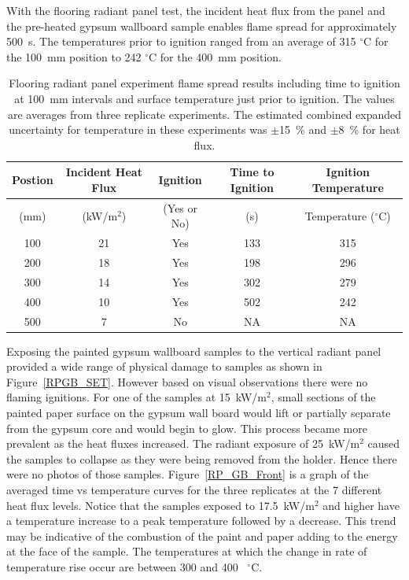 \documentclass[twoside]{uocthesis}
\begin{document}
 With the flooring radiant panel test, the incident heat flux from the panel and the pre-heated gypsum wallboard sample enables flame spread for approximately 500~s.  The temperatures prior to ignition ranged from an average of 315 $^{\circ}$C for the 100~mm position to 242 $^{\circ}$C for the 400~mm position.      
 
      
\begin{table}
	\centering
	\small
	\begin{tabular}{|c|c|c|c|c|}
		\hline Postion & Incident Heat Flux & Ignition & Time to Ignition & Ignition Temperature \\
		\hline (mm) & (kW/m$^2$) & (Yes or No) & (s)  & Temperature ($^{\circ}$C)   \\ \hline
		\hline 100 	& 21	& Yes 	& 133	& 315 	 \\
		\hline 200	& 18 	& Yes 	& 198 	& 296 	 \\
		\hline 300	& 14	& Yes 	& 302 	& 279 	 \\
		\hline 400	& 10	& Yes 	& 502 	& 242 	 \\
		\hline 500	&  7	& No 	& NA 	& NA   	 \\
		\hline
	\end{tabular}
	\caption[Flooring radiant panel experiment flame spread results]{Flooring radiant panel experiment flame spread results including time to ignition at 100~mm intervals and surface temperature just prior to ignition.  The values are averages from three replicate experiments.  The estimated combined expanded uncertainty for temperature in these experiments was $\pm$15~\% and $\pm$8~\% for heat flux.}
	\label{tab:FRP_timetemp}
\end{table}


Exposing the painted gypsum wallboard samples to the vertical radiant panel provided a wide range of physical damage to samples as shown in Figure~\ref{RPGB_SET}.  However based on visual observations there were no flaming ignitions.  For one of the samples at 15~kW/m$^2$, small sections of the painted paper surface on the gypsum wall board would lift or partially separate from the gypsum core and would begin to glow.  This process became more prevalent as the heat fluxes increased.  The radiant exposure of 25~kW/m$^2$ caused the samples to collapse as they were being removed from the holder.  Hence there were no photos of those samples.   Figure~\ref{RP_GB_Front} is a graph of the averaged time vs temperature curves for the three replicates at the 7 different heat flux levels.  Notice that the samples exposed to 17.5~kW/m$^2$ and higher have a temperature increase to a peak temperature followed by a decrease.  This trend may be indicative of the combustion of the paint and paper adding to the energy at the face of the sample. The temperatures at which the change in rate of temperature rise occur are between 300 and 400~ $^{\circ}$C.       
  
\end{document}
